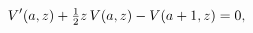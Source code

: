 \[\mathop{V\/}\nolimits'\!\left(a,z\right)+\tfrac{1}{2}z\mathop{V\/}\nolimits\!%
\left(a,z\right)-\mathop{V\/}\nolimits\!\left(a+1,z\right)=0,\]